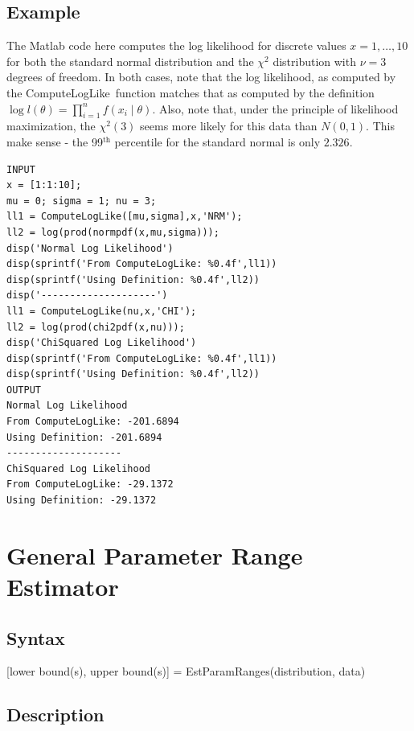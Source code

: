 \documentclass{book}
\newcommand{\textcode}[1]{\textsf{\small #1}}   %
\begin{document}
\subsection*{Example}

The Matlab code here computes the log likelihood for discrete values $%
x=1,\ldots ,10$ for both the standard normal distribution and the
$\chi ^{2}$ distribution with $\nu =3$ degrees of freedom. In both
cases, note that the log likelihood, as computed by the
\textcode{ComputeLogLike}\ function matches that as computed by the
definition $\log l\left( \theta \right) =\prod_{i=1}^{n}f\left(
x_{i}\mid \theta \right) $. Also, note that, under the principle of
likelihood maximization, the $\chi ^{2}\left( 3\right) $ seems more
likely for this data than $N\left( 0,1\right) $. This make sense -
the 99$^{\text{th}}$ percentile for the standard normal is only
$2.326$.
\begin{verbatim}
INPUT
x = [1:1:10];
mu = 0; sigma = 1; nu = 3;
ll1 = ComputeLogLike([mu,sigma],x,'NRM');
ll2 = log(prod(normpdf(x,mu,sigma)));
disp('Normal Log Likelihood')
disp(sprintf('From ComputeLogLike: %0.4f',ll1))
disp(sprintf('Using Definition: %0.4f',ll2))
disp('--------------------')
ll1 = ComputeLogLike(nu,x,'CHI');
ll2 = log(prod(chi2pdf(x,nu)));
disp('ChiSquared Log Likelihood')
disp(sprintf('From ComputeLogLike: %0.4f',ll1))
disp(sprintf('Using Definition: %0.4f',ll2))
OUTPUT
Normal Log Likelihood
From ComputeLogLike: -201.6894
Using Definition: -201.6894
--------------------
ChiSquared Log Likelihood
From ComputeLogLike: -29.1372
Using Definition: -29.1372
\end{verbatim}

\section{General Parameter Range Estimator}

\subsection*{Syntax}

\textcode{[lower bound(s), upper bound(s)] =
EstParamRanges(distribution, data)}

\subsection*{Description}
\end{document}
